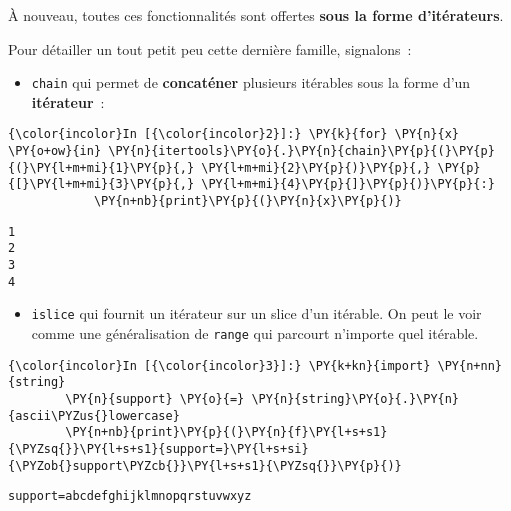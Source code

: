 À nouveau, toutes ces fonctionnalités sont offertes \textbf{sous la
forme d'itérateurs}.

    Pour détailler un tout petit peu cette dernière famille, signalons~:

    \begin{itemize}
\tightlist
\item
  \texttt{chain} qui permet de \textbf{concaténer} plusieurs itérables
  sous la forme d'un \textbf{itérateur}~:
\end{itemize}

    \begin{Verbatim}[commandchars=\\\{\},frame=single,framerule=0.3mm,rulecolor=\color{cellframecolor}]
{\color{incolor}In [{\color{incolor}2}]:} \PY{k}{for} \PY{n}{x} \PY{o+ow}{in} \PY{n}{itertools}\PY{o}{.}\PY{n}{chain}\PY{p}{(}\PY{p}{(}\PY{l+m+mi}{1}\PY{p}{,} \PY{l+m+mi}{2}\PY{p}{)}\PY{p}{,} \PY{p}{[}\PY{l+m+mi}{3}\PY{p}{,} \PY{l+m+mi}{4}\PY{p}{]}\PY{p}{)}\PY{p}{:}
            \PY{n+nb}{print}\PY{p}{(}\PY{n}{x}\PY{p}{)}
\end{Verbatim}


    \begin{Verbatim}[commandchars=\\\{\},frame=single,framerule=0.3mm,rulecolor=\color{cellframecolor}]
1
2
3
4
\end{Verbatim}

    \begin{itemize}
\tightlist
\item
  \texttt{islice} qui fournit un itérateur sur un slice d'un itérable.
  On peut le voir comme une généralisation de \texttt{range} qui
  parcourt n'importe quel itérable.
\end{itemize}

    \begin{Verbatim}[commandchars=\\\{\},frame=single,framerule=0.3mm,rulecolor=\color{cellframecolor}]
{\color{incolor}In [{\color{incolor}3}]:} \PY{k+kn}{import} \PY{n+nn}{string}
        \PY{n}{support} \PY{o}{=} \PY{n}{string}\PY{o}{.}\PY{n}{ascii\PYZus{}lowercase}
        \PY{n+nb}{print}\PY{p}{(}\PY{n}{f}\PY{l+s+s1}{\PYZsq{}}\PY{l+s+s1}{support=}\PY{l+s+si}{\PYZob{}support\PYZcb{}}\PY{l+s+s1}{\PYZsq{}}\PY{p}{)}
\end{Verbatim}


    \begin{Verbatim}[commandchars=\\\{\},frame=single,framerule=0.3mm,rulecolor=\color{cellframecolor}]
support=abcdefghijklmnopqrstuvwxyz
\end{Verbatim}

